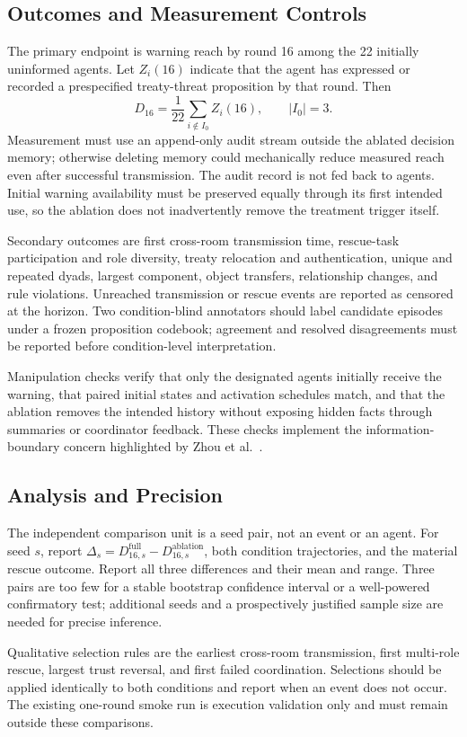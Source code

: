 \subsection{Outcomes and Measurement Controls}
The primary endpoint is warning reach by round 16 among the 22 initially
uninformed agents. Let $Z_i(16)$ indicate that the agent has expressed or
recorded a prespecified treaty-threat proposition by that round. Then
\begin{equation}
D_{16}=\frac{1}{22}\sum_{i\notin I_0}Z_i(16),
\qquad |I_0|=3.
\end{equation}
Measurement must use an append-only audit stream outside the ablated decision
memory; otherwise deleting memory could mechanically reduce measured reach
even after successful transmission. The audit record is not fed back to
agents. Initial warning availability must be preserved equally through its
first intended use, so the ablation does not inadvertently remove the treatment
trigger itself.

Secondary outcomes are first cross-room transmission time, rescue-task
participation and role diversity, treaty relocation and authentication,
unique and repeated dyads, largest component, object transfers, relationship
changes, and rule violations. Unreached transmission or rescue events are
reported as censored at the horizon. Two condition-blind annotators should
label candidate episodes under a frozen proposition codebook; agreement and
resolved disagreements must be reported before condition-level interpretation.

Manipulation checks verify that only the designated agents initially receive
the warning, that paired initial states and activation schedules match, and
that the ablation removes the intended history without exposing hidden facts
through summaries or coordinator feedback. These checks implement the
information-boundary concern highlighted by Zhou et al.\ \cite{misleading}.

\subsection{Analysis and Precision}
The independent comparison unit is a seed pair, not an event or an agent.
For seed $s$, report
$\Delta_s=D_{16,s}^{\mathrm{full}}-D_{16,s}^{\mathrm{ablation}}$, both condition
trajectories, and the material rescue outcome. Report all three differences
and their mean and range. Three pairs are too few for a stable bootstrap
confidence interval or a well-powered confirmatory test; additional seeds
and a prospectively justified sample size are needed for precise inference.

Qualitative selection rules are the earliest cross-room transmission, first
multi-role rescue, largest trust reversal, and first failed coordination.
Selections should be applied identically to both conditions and report when
an event does not occur. The existing one-round smoke run is execution
validation only and must remain outside these comparisons.
